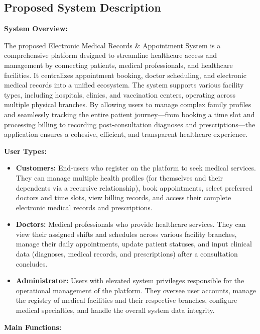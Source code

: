 \subsection{Proposed System Description}
\textbf{System Overview:} \par
The proposed Electronic Medical Records \& Appointment System is a comprehensive platform designed to streamline healthcare access and management by connecting patients, medical professionals, and healthcare facilities. It centralizes appointment booking, doctor scheduling, and electronic medical records into a unified ecosystem. The system supports various facility types, including hospitals, clinics, and vaccination centers, operating across multiple physical branches. By allowing users to manage complex family profiles and seamlessly tracking the entire patient journey—from booking a time slot and processing billing to recording post-consultation diagnoses and prescriptions—the application ensures a cohesive, efficient, and transparent healthcare experience. \par
\textbf{User Types:}
\begin{itemize}
    \item \textbf{Customers:} End-users who register on the platform to seek medical services. They can manage multiple health profiles (for themselves and their dependents via a recursive relationship), book appointments, select preferred doctors and time slots, view billing records, and access their complete electronic medical records and prescriptions.
    \item \textbf{Doctors:} Medical professionals who provide healthcare services. They can view their assigned shifts and schedules across various facility branches, manage their daily appointments, update patient statuses, and input clinical data (diagnoses, medical records, and prescriptions) after a consultation concludes.
    \item \textbf{Administrator:} Users with elevated system privileges responsible for the operational management of the platform. They oversee user accounts, manage the registry of medical facilities and their respective branches, configure medical specialties, and handle the overall system data integrity.
\end{itemize}
\textbf{Main Functions:} 
